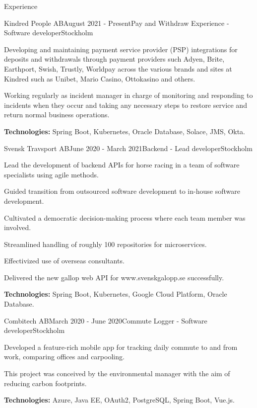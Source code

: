 \documentclass{resume}
\begin{document}
  \begin{rSection}{Experience}
      \begin{rSubsection}{Kindred People AB}{August 2021 - Present}{Pay and Withdraw Experience - Software developer}{Stockholm}
      \item Developing and maintaining payment service provider (PSP) integrations for deposits and withdrawals through payment providers such Adyen, Brite, Earthport, Swish, Trustly, Worldpay across the various brands and sites at Kindred such as Unibet, Mario Casino, Ottokasino and others. 
      \item Working regularly as incident manager in charge of monitoring and responding to incidents when they occur and taking any necessary steps to restore service and return normal business operations.
      \item \textbf{Technologies:} Spring Boot, Kubernetes, Oracle Database, Solace, JMS, Okta.
    \end{rSubsection}
    
    \begin{rSubsection}{Svensk Travsport AB}{June 2020 - March 2021}{Backend - Lead developer}{Stockholm}
      \item Lead the development of backend APIs for horse racing in a team of software specialists using agile methods.
      \item Guided transition from outsourced software development to in-house software development.
      \item Cultivated a democratic decision-making process where each team member was involved.
      \item Streamlined handling of roughly 100 repositories for microservices.
      \item Effectivized use of overseas consultants.
      \item Delivered the new gallop web API for www.svenskgalopp.se successfully.
      \item \textbf{Technologies:} Spring Boot, Kubernetes, Google Cloud Platform, Oracle Database.
    \end{rSubsection}

    \begin{rSubsection}{Combitech AB}{March 2020 - June 2020}{Commute Logger - Software developer}{Stockholm}
      \item Developed a feature-rich mobile app for tracking daily commute to and from work, comparing offices and carpooling.
      \item This project was conceived by the environmental manager with the aim of reducing carbon footprints.
      \item \textbf{Technologies:} Azure, Java EE, OAuth2, PostgreSQL, Spring Boot, Vue.js.
    \end{rSubsection}


\end{rSection}
\end{document}
